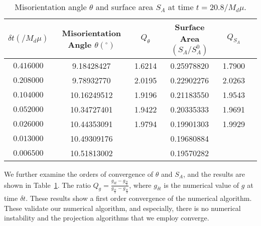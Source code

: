 \begin{table}[htbp]
    \caption{\label{tab:table-1}         \protect\\
Misorientation angle $\theta$ and surface area $S_A$ at time $t=20.8 /M_d\mu$.}
\centering
\begin{tabular}{|c|c|c|c|c|c}
\hline
$\delta t (/M_d\mu)$& Misorientation Angle $\theta (^\circ)$  & $Q_\theta$ & Surface Area $(S_A/S_A^0)$ & $Q_{S_A}$ \\
\hline
$0.416000$&9.18428427 & 1.6214   &0.25978820 & 1.7900\\
\hline
$0.208000$&9.78932770 & 2.0195     &0.22902276 & 2.0263\\
\hline
$0.104000$&10.16249512 &1.9196 &0.21183550 & 1.9543\\
\hline
   $0.052000$&10.34727401 &1.9422 &0.20335333 &1.9691 \\
\hline
$0.026000$&10.44353091 &  1.9794 &0.19901303 &  1.9929 \\
\hline
$0.013000$&10.49309176 & &0.19680884 & \\
\hline
$0.006500$&10.51813002 &  &0.19570282 & \\
\hline
\end{tabular}
\end{table}

We further examine the orders of convergence of $\theta$ and $S_A$, and the results are shown in Table~\ref{tab:table-1}.  The ratio $Q_g=\frac{g_{\delta t}-g_{\frac{\delta t}{2}}}{g_{\frac{\delta t}{2}}-g_{\frac{\delta t}{4}}}$, where $g_{\delta t}$ is the numerical value of $g$ at time $\delta t$.
These results show a first order convergence of the numerical algorithm.
 These validate our numerical algorithm, and especially,  there is no numerical instability and the  projection algorithms that we employ converge.



